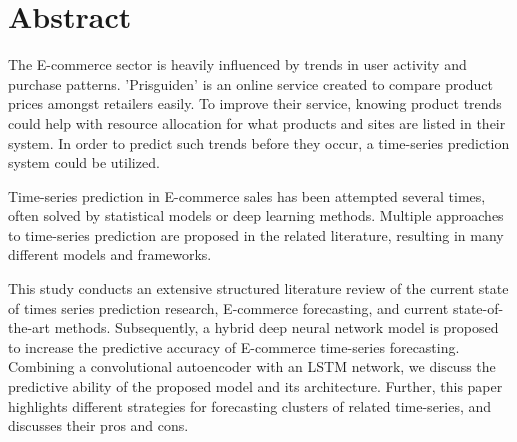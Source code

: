 \section*{Abstract}
\label{section:Abstract}

The E-commerce sector is heavily influenced by trends in user activity and purchase patterns.
'Prisguiden' is an online service created to compare product prices amongst retailers easily.
To improve their service, knowing product trends could help with resource allocation for what products and sites are listed in their system.
In order to predict such trends before they occur, a time-series prediction system could be utilized.

Time-series prediction in E-commerce sales has been attempted several times,
often solved by statistical models or deep learning methods.
Multiple approaches to time-series prediction are proposed in the related literature,
resulting in many different models and frameworks.

This study conducts an extensive structured literature review of the current state of times series prediction research, E-commerce forecasting,
and current state-of-the-art methods.
Subsequently, a hybrid deep neural network model is proposed to increase the predictive accuracy of E-commerce time-series forecasting.
Combining a convolutional autoencoder with an LSTM network, we discuss the predictive ability of the proposed model
and its architecture.
Further, this paper highlights different strategies for forecasting clusters of related time-series, and discusses their pros and cons.
